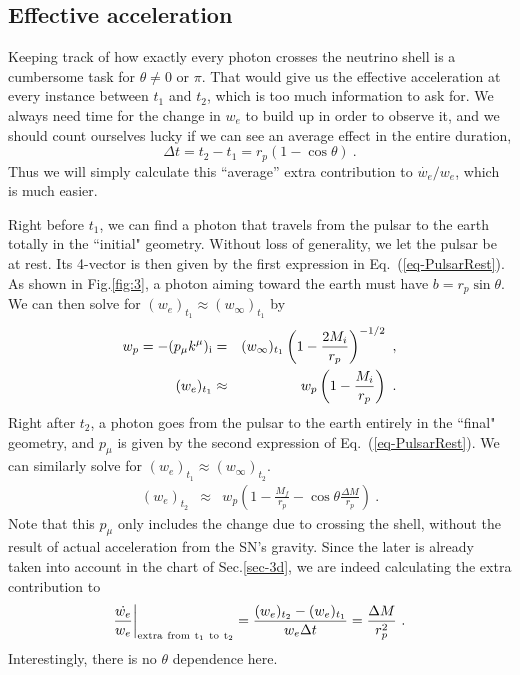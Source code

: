 \documentclass[aps,showpacs,twocolumn,floats,prd,superscriptaddress,nofootinbib]{revtex4}
\begin{document}
\subsection{Effective acceleration}

Keeping track of how exactly every photon crosses the neutrino shell is a cumbersome task for $\theta\neq 0$ or $\pi$. That would give us the effective acceleration at every instance between $t_1$ and $t_2$, which is too much information to ask for. We always need time for the change in $w_e$ to build up in order to observe it, and we should count ourselves lucky if we can see an average effect in the entire duration,
\begin{equation}
\Delta t = t_2- t_1 = r_p(1-\cos\theta)~.
\end{equation}
Thus we will simply calculate this ``average'' extra contribution to $\dot{w_e}/w_e$, which is much easier.

Right before $t_1$, we can find a photon that travels from the pulsar to the earth totally in the ``initial" geometry. Without loss of generality, we let the pulsar be at rest. Its 4-vector is then given by the first expression in Eq.~(\ref{eq-PulsarRest}). As shown in Fig.\ref{fig:3}, a photon aiming toward the earth must have $b = r_p\sin\theta$. We can then solve for $(w_e)_{t_1} \approx (w_\infty)_{t_1}$ by
\begin{eqnarray}
w_p = -(p_\mu k^\mu)_{\rm i} &=& 
(w_\infty)_{t_1} \left(1-\frac{2M_i}{r_p}\right)^{-1/2}~, \nonumber \\
(w_e)_{t_1} &\approx& w_p \left(1-\frac{M_i}{r_p}\right)~.
\end{eqnarray}
Right after $t_2$, a photon goes from the pulsar to the earth entirely in the ``final" geometry, and $p_\mu$ is given by the second expression of Eq.~(\ref{eq-PulsarRest}). We can similarly solve for $(w_e)_{t_1}\approx (w_\infty)_{t_2}$. 
\begin{eqnarray}
(w_e)_{t_2} &\approx& w_p \left(1-\frac{M_f}{r_p} - \cos\theta \frac{\Delta M}{r_p}\right)~.
\end{eqnarray}
Note that this $p_\mu$ only includes the change due to crossing the shell, without the result of actual acceleration from the SN's gravity. Since the later is already taken into account in the chart of Sec.\ref{sec-3d}, we are indeed calculating the extra contribution to
\begin{equation}
\frac{\dot{w_e}}{w_e}\bigg|_{\rm extra \ from \ t_1 \ to \ t_2} = \frac{(w_e)_{t_2}-(w_e)_{t_1}}{w_e\Delta t} = \frac{\Delta M}{r_p^2}~.
\end{equation}
Interestingly, there is no $\theta$ dependence here.
\end{document}
